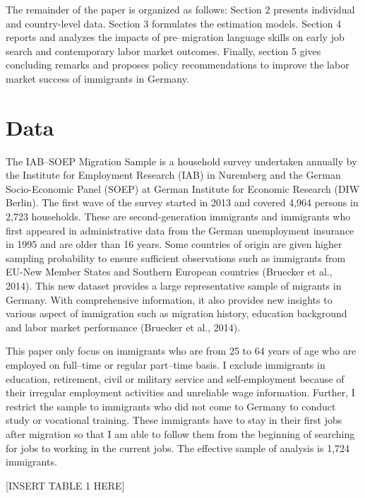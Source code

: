 \documentclass[12pt,a4paper]{article}
\begin{document}
The remainder of the paper is organized as follows: Section 2 presents individual and country-level data. Section 3 formulates the estimation models. Section 4 reports and analyzes the impacts of pre--migration language skills on early job search and contemporary labor market outcomes. Finally, section 5 gives concluding remarks and proposes policy recommendations to improve the labor market success of immigrants in Germany.

\section{Data}

The IAB--SOEP Migration Sample is a household survey undertaken annually by the Institute for Employment Research (IAB) in Nuremberg and the German Socio-Economic Panel (SOEP) at German Institute for Economic Research (DIW Berlin). The first wave of the survey started in 2013 and covered 4,964 persons in 2,723 households. These are second-generation immigrants and immigrants who first appeared in administrative data from the German unemployment insurance in 1995 and are older than 16 years. Some countries of origin are given higher sampling probability to ensure sufficient observations such as immigrants from EU-New Member States and Southern European countries (Bruecker et al., 2014). This new dataset provides a large representative sample of migrants in Germany. With comprehensive information, it also provides new insights to various aspect of immigration such as migration history, education background and labor market performance (Bruecker et al., 2014).

This paper only focus on immigrants who are from 25 to 64 years of age who are employed on full--time or regular part--time basis. I exclude immigrants in education, retirement, civil or military service and self-employment because of their irregular employment activities and unreliable wage information. Further, I restrict the sample to immigrants who did not come to Germany to conduct study or vocational training. These immigrants have to stay in their first jobs after migration so that I am able to follow them from the beginning of searching for jobs to working in the current jobs. The effective sample of analysis is 1,724 immigrants.

\begin{center}
[INSERT TABLE 1 HERE]
\end{center}
\end{document}
